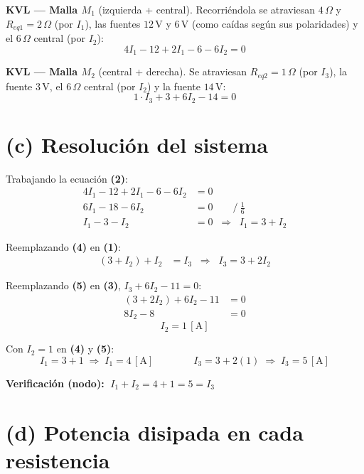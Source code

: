 \documentclass[12pt,letterpaper]{article}
\begin{document}
\medskip
\noindent\textbf{KVL --- Malla $M_1$} (izquierda + central). Recorri\'endola se atraviesan
$4\,\Omega$ y $R_{eq1}=2\,\Omega$ (por $I_1$), las fuentes $12\,$V y $6\,$V (como ca\'idas seg\'un
sus polaridades) y el $6\,\Omega$ central (por $I_2$):
\[
    \boxed{4I_1 - 12 + 2I_1 - 6 - 6I_2 = 0} \tag{2}
\]

\medskip
\noindent\textbf{KVL --- Malla $M_2$} (central + derecha). Se atraviesan $R_{eq2}=1\,\Omega$
(por $I_3$), la fuente $3\,$V, el $6\,\Omega$ central (por $I_2$) y la fuente $14\,$V:
\[
    \boxed{1\cdot I_3 + 3 + 6I_2 - 14 = 0} \tag{3}
\]

\section*{(c) Resoluci\'on del sistema}

\noindent Trabajando la ecuaci\'on \textbf{(2)}:
\begin{align*}
    4I_1 - 12 + 2I_1 - 6 - 6I_2 &= 0 \\
    6I_1 - 18 - 6I_2 &= 0 \qquad\Big/\ \tfrac{1}{6} \\
    I_1 - 3 - I_2 &= 0 \;\;\Rightarrow\;\; I_1 = 3 + I_2 \tag{4}
\end{align*}

\noindent Reemplazando \textbf{(4)} en \textbf{(1)}:
\begin{align*}
    (3 + I_2) + I_2 &= I_3 \;\;\Rightarrow\;\; I_3 = 3 + 2I_2 \tag{5}
\end{align*}

\noindent Reemplazando \textbf{(5)} en \textbf{(3)}, $I_3 + 6I_2 - 11 = 0$:
\begin{align*}
    (3 + 2I_2) + 6I_2 - 11 &= 0 \\
    8I_2 - 8 &= 0
\end{align*}
\[
    \boxed{I_2 = 1\,[\text{A}]}
\]

\noindent Con $I_2 = 1$ en \textbf{(4)} y \textbf{(5)}:
\[
    I_1 = 3 + 1 \;\Rightarrow\; \boxed{I_1 = 4\,[\text{A}]}
    \qquad\qquad
    I_3 = 3 + 2(1) \;\Rightarrow\; \boxed{I_3 = 5\,[\text{A}]}
\]

\noindent\textbf{Verificaci\'on (nodo):} $\;I_1 + I_2 = 4 + 1 = 5 = I_3$ \checkmark

\section*{(d) Potencia disipada en cada resistencia}
\end{document}
